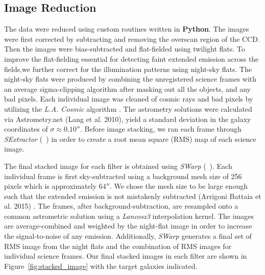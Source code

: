 \documentclass[twocolumn]{aastex61}
\newcommand{\citeth}[1]{(\citeauthor{#1}\ \citeyear{#1})}
\begin{document}
\subsection{Image Reduction}
The data were reduced using custom routines written in \textbf{Python}. 
The images were first corrected by subtracting and removing the overscan region of the CCD. 
Then the images were bias-subtracted and flat-fielded using twilight flats.
To improve the flat-fielding essential for detecting faint extended emission across the fields,we further correct for the illumination patterns using night-sky flats. The night-sky flats were produced by combining the unregistered science frames with an average sigma-clipping algorithm after masking out all the objects, and any bad pixels. Each individual image was cleaned of cosmic rays and bad pixels by utilizing the \emph{L.A. Cosmic} algorithm \citep{Dokkum2001}.
The astrometry solutions were calculated via Astrometry.net (Lang et al. 2010)\nocite{Lang}, yield a standard deviation in the galaxy coordinates of $\sigma \approx 0.10''$. Before image stacking, we ran each frame through \emph{SExtractor} \citeth{Bertin} in order to create a root mean square (RMS) map of each science image.


The final stacked image for each filter is obtained using \emph{SWarp} \citeth{Bertin}.
Each individual frame is first sky-subtracted using a background mesh size of 256 pixels which is approximately $64''$. 
We chose the mesh size to be large enough such that the extended emission is not mistakenly subtracted (Arrigoni Battaia et al. 2015) \nocite{Battaia_2015}. 
The frames, after background-subtraction, are resampled onto a common astrometric solution using a \textit{Lancosz3} interpolation kernel. 
The images are average-combined and weighted by the night-flat image in order to increase the signal-to-noise of any  emission. Additionally, \emph{SWarp} generates a final set of RMS image from the night flats and the combination of RMS images for individual science frames. Our final stacked images in each filter are shown in Figure~\ref{fig:stacked_image} with the target galaxies indicated.  
\end{document}
